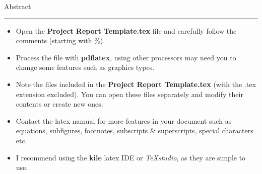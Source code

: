 {\Large Abstract}\\
\hrule

\begin{itemize}
\item Open the {\bf Project Report Template.tex} file and carefully follow the comments (starting with \%).
\item Process the file with {\bf pdflatex}, using other processors may need you to change some features such as graphics types.
\item Note the files included in the  {\bf Project Report Template.tex} (with the .tex extension excluded). You can open these files separately and modify their contents 
or create new ones.
\item Contact the latex namual for more features in your document such as equations, subfigures, footnotes, subscripts \& superscripts, special characters etc.
\item I recommend using the {\bf kile} latex IDE or \emph{TeXstudio}, as they are simple to use.
\end{itemize}

